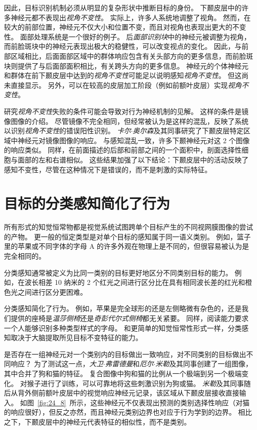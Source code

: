 因此，目标识别机制必须从明显的复杂形状中推断目标的身份。
下颞皮层中的许多神经元都不表现出\textit{视角不变性}。
实际上，许多人系统地调整了视角。
然而，在较大的前部位置，神经元不仅大小和位置不变，而且对视角也表现出更大的不变性。
面部处理系统是一个很好的例子。
后\textit{面部识别块}中的神经元被调整为视角，而前脸斑块中的神经元表现出极大的稳健性，可以改变视点的变化。
因此，与前部区域相比，后面面部区域中的群体响应包含有关头部方向的更多信息，而前脸斑块则提供了与后面部面积相比，有关跨头方向的更多信息。
神经元的个体神经元和群体在前下颞皮层中达到的\textit{视角不变性}可能足以说明感知\textit{视角不变性}。
但这尚未直接显示。
另外，可以在较高的皮层加工阶段（例如前额叶皮层）实现\textit{视角不变性}。


研究\textit{视角不变性}失败的条件可能会导致对行为神经机制的见解。
这样的条件是镜像图像的介绍。
尽管镜像不完全相同，但经常被认为是这样的混乱，反映了系统以识别\textit{视角不变性}的错误阳性识别。
\textit{卡尔$\cdot$奥尔森}及其同事研究了下颞皮层特定区域中神经元对镜像图像的响应\cite{rollenhagen2000mirror}。
与感知混乱一致，许多下颞神经元对这 2 个图像的响应类似。
同样，在前面描述的后部和前部之间的一个面积中，剖面选择性细胞与面部的左和右谱相似。
这些结果加强了以下结论：下颞皮层中的活动反映了感知不变性，尽管在这种情况下是错误的，而不是刺激的实际特征。



\section{目标的分类感知简化了行为}

所有形式的知觉恒常物都是视觉系统试图跨单个目标产生的不同视网膜图像的尝试的产物。
更一般的恒定类型是对单个目标的感知属于同一语义类别。
例如，篮子里的苹果或不同字体的字母 A 的许多外观在物理上是不同的，但很容易被认为是完全相同的。


分类感知通常被定义为比同一类别的目标更好地区分不同类别目标的能力。
例如，在波长相差 10 纳米的 2 个红光之间进行区分比在具有相同波长差的红光和橙色光之间进行区分更困难。


分类感知简化了行为。
例如，苹果是完全球形的还是左侧略微有杂色的，还是我们提供的座椅是\textit{温莎侧椅}还是\textit{奇彭代尔式侧椅}都无关紧要。
同样，阅读能力要求一个人能够识别多种类型样式的字母。
和更简单的知觉恒常性形式一样，分类感知取决于大脑提取所见目标不变特征的能力。


是否存在一组神经元对一个类别内的目标做出一致响应，对不同类别的目标做出不同响应？
为了测试这一点，\textit{大卫$\cdot$弗雷德曼}和\textit{厄尔$\cdot$米勒}及其同事创建了一组图像，其中合并了狗和猫的特征\cite{freedman2008neural}。
复合图像中狗和猫的比例从一个极端到另一个极端变化。 
对猴子进行了训练，可以可靠地将这些刺激识别为狗或猫。
\textit{米勒}及其同事随后从背外侧前额叶皮层中的视觉响应神经元记录，该区域从下颞皮层接收直接输入\cite{miller1991neural}。
如图~\ref{fig:24_8}~所示，这些神经元不仅表现出预测的类别选择性响应（对猫的响应很好），但反之亦然，而且神经元类别边界也对应于行为学到的边界。 
相比之下，下颞皮层中的神经元代表特征的相似性，而不是类别。


